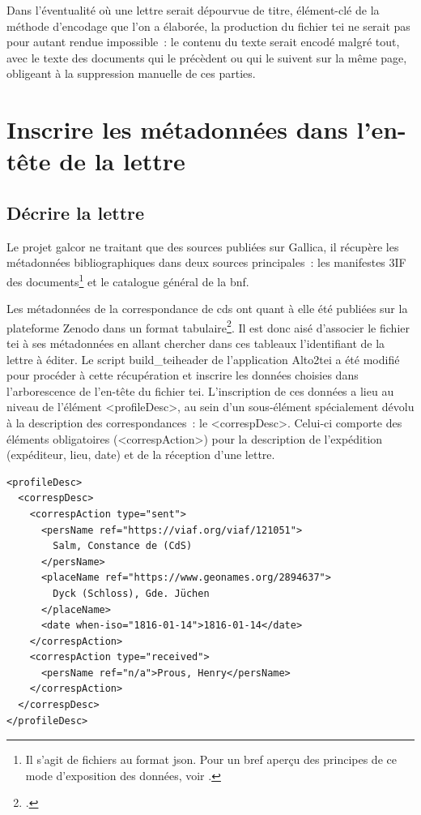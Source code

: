 \documentclass[a4paper,12pt,twoside]{book}
\begin{document}
			Dans l'éventualité où une lettre serait dépourvue de titre, élément-clé de la méthode d'encodage que l'on a élaborée, la production du fichier \gls{tei} ne serait pas pour autant rendue impossible~: le contenu du texte serait encodé malgré tout, avec le texte des documents qui le précèdent ou qui le suivent sur la même page, obligeant à la suppression manuelle de ces parties.
			
		\section{Inscrire les métadonnées dans l'en-tête de la lettre}
		
			\subsection{Décrire la lettre}
				Le projet \gls{galcor} ne traitant que des sources publiées sur Gallica, il récupère les métadonnées bibliographiques dans deux sources principales~: les manifestes 3IF des documents\footnote{Il s'agit de fichiers au format \gls{json}. Pour un bref aperçu des principes de ce mode d'exposition des données, voir \cite{robineauComprendreIIIFInteroperabilite2016}.} et le catalogue général de la \gls{bnf}.
				
				Les métadonnées de la correspondance de \gls{cds} ont quant à elle été publiées sur la plateforme Zenodo dans un format tabulaire\footcite{peyronnetdrydenInventarKorrespondenzConstance2021}. Il est donc aisé d'associer le fichier \gls{tei} à ses métadonnées en allant chercher dans ces tableaux l'identifiant de la lettre à éditer. Le script \textsf{build\_teiheader} de l'application Alto2tei a été modifié pour procéder à cette récupération et inscrire les données choisies dans l'arborescence de l'en-tête du fichier \gls{tei}. L'inscription de ces données a lieu au niveau de l'élément \textsf{<profileDesc>}, au sein d'un sous-élément spécialement dévolu à la description des correspondances~: le \textsf{<correspDesc>}. Celui-ci comporte des éléments obligatoires (\textsf{<correspAction>}) pour la description de l'expédition (expéditeur, lieu, date) et de la réception d'une lettre.
				
				\small
				\begin{verbatim}
<profileDesc>
  <correspDesc>
    <correspAction type="sent">
      <persName ref="https://viaf.org/viaf/121051">
        Salm, Constance de (CdS)
      </persName>
      <placeName ref="https://www.geonames.org/2894637">
        Dyck (Schloss), Gde. Jüchen
      </placeName>
      <date when-iso="1816-01-14">1816-01-14</date>
    </correspAction>
    <correspAction type="received">
      <persName ref="n/a">Prous, Henry</persName>
    </correspAction>
  </correspDesc>
</profileDesc>
				\end{verbatim}
				\normalsize
			
\end{document}

